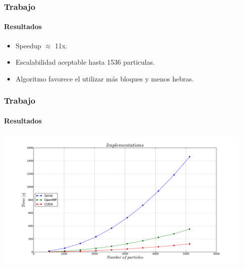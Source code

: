 \frame
{
\frametitle{Trabajo}
\framesubtitle{Resultados }
\begin{itemize}
	\item Speedup $\approx$ 11x.
	\item Escalabilidad aceptable hasta 1536 particulas.
	\item Algoritmo favorece el utilizar más bloques y menos hebras.
\end{itemize}
}

\frame
{
\frametitle{Trabajo}
\framesubtitle{Resultados }
\begin{center}
	\includegraphics[width=0.95\textwidth]{img/all.pdf}
\end{center}
}

